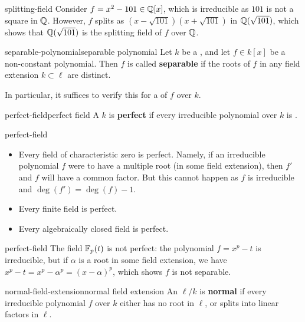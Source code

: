 \begin{example}{splitting-field}
    Consider $f = x^2 - 101 \in \mathbb{Q}[x]$, which is irreducible as $101$ is not a square in $\mathbb{Q}$. However, $f$ splits as $(x - \sqrt{101})(x + \sqrt{101})$ in $\mathbb{Q}(\sqrt{101})$, which shows that $\mathbb{Q}(\sqrt{101})$ is the splitting field of $f$ over $\mathbb{Q}$.
\end{example}

\begin{topic}{separable-polynomial}{separable polynomial}
    Let $k$ be a , and let $f \in k[x]$ be a non-constant polynomial. Then $f$ is called \textbf{separable} if the roots of $f$ in any field extension $k \subset \ell$ are distinct.
    
    In particular, it suffices to verify this for a  of $f$ over $k$.
\end{topic}

\begin{topic}{perfect-field}{perfect field}
    A  $k$ is \textbf{perfect} if every irreducible polynomial over $k$ is .
\end{topic}

\begin{example}{perfect-field}
    \begin{itemize}
        \item Every field of characteristic zero is perfect. Namely, if an irreducible polynomial $f$ were to have a multiple root (in some field extension), then $f'$ and $f$ will have a common factor. But this cannot happen as $f$ is irreducible and $\deg(f') = \deg(f) - 1$.
        \item Every finite field is perfect.
        \item Every algebraically closed field is perfect.
    \end{itemize}
\end{example}

\begin{example}{perfect-field}
    The field $\mathbb{F}_p(t)$ is not perfect: the polynomial $f = x^p - t$ is irreducible, but if $\alpha$ is a root in some field extension, we have $x^p - t = x^p - \alpha^p = (x - \alpha)^p$, which shows $f$ is not separable.
\end{example}

\begin{topic}{normal-field-extension}{normal field extension}
    An  $\ell/k$ is \textbf{normal} if every irreducible polynomial $f$ over $k$ either has no root in $\ell$, or splits into linear factors in $\ell$.
\end{topic}

